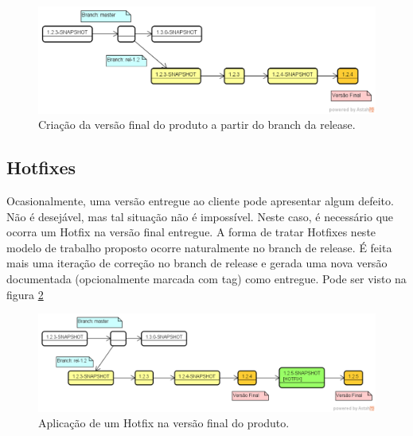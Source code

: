 \begin{figure}[h!]
	\centering
	\includegraphics[width=0.7\linewidth]{img/branching_otojr_02}
	\caption[Cria{\c c}{\~a}o da vers{\~a}o final]{Cria{\c c}{\~a}o da vers{\~a}o final do produto a partir do branch da release.}
	\label{fig:finalrelease}
\end{figure}

\subsection{Hotfixes}
\label{subsec:hotfixes}
Ocasionalmente, uma vers{\~a}o entregue ao cliente pode apresentar algum defeito. N{\~a}o {\'e} desej{\'a}vel, mas tal situa{\c c}{\~a}o n{\~a}o {\'e} imposs{\'i}vel. Neste caso, {\'e} necess{\'a}rio que ocorra um Hotfix na vers{\~a}o final entregue. A forma de tratar Hotfixes neste modelo de trabalho proposto ocorre naturalmente no branch de release. É feita mais uma itera{\c c}{\~a}o de corre{\c c}{\~a}o no branch de release e gerada uma nova vers{\~a}o documentada (opcionalmente marcada com tag) como entregue. Pode ser visto na figura \ref{fig:hotfix}

\begin{figure}[h!]
	\centering
	\includegraphics[width=0.7\linewidth]{img/branching_otojr_03}
	\caption[Hotfix na vers{\~a}o final]{Aplica{\c c}{\~a}o de um Hotfix na vers{\~a}o final do produto.}
	\label{fig:hotfix}
\end{figure}